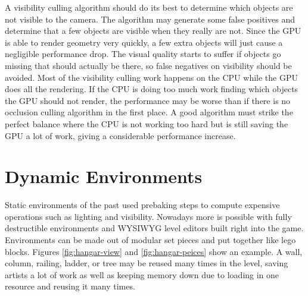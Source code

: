 \documentclass[12pt]{ucthesis}
\begin{document}
A visibility culling algorithm should do its best to determine which objects are not visible to the camera.
The algorithm may generate some false positives and determine that a few objects are visible when they really are not.
Since the GPU is able to render geometry very quickly, a few extra objects will just cause a negligible performance drop.\cite{large-occluders}
The visual quality starts to suffer if objects go missing that should actually be there, so false negatives on visibility should be avoided.
Most of the visibility culling work happens on the CPU while the GPU does all the rendering.
If the CPU is doing too much work finding which objects the GPU should not render, the performance may be worse than if there is no occlusion culling algorithm in the first place.
A good algorithm must strike the perfect balance where the CPU is not working too hard but is still saving the GPU a lot of work, giving a considerable performance increase.

\section{Dynamic Environments}
\label{dynamic-environments}

Static environments of the past used prebaking steps to compute expensive operations such as lighting and visibility.
Nowadays more is possible with fully destructible environments and WYSIWYG level editors built right into the game.
Environments can be made out of modular set pieces and put together like lego blocks.
Figures \ref{fig:hangar-view} and \ref{fig:hangar-peices} show an example.
A wall, column, railing, ladder, or tree may be reused many times in the level, saving artists a lot of work as well as keeping memory down due to loading in one resource and reusing it many times.
\end{document}
